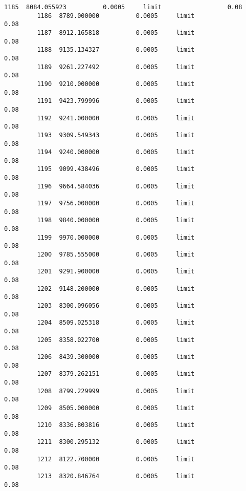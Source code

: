 \documentclass[11pt]{article}
\begin{document}
\begin{Verbatim}[commandchars=\\\{\}]
         1185  8084.055923          0.0005     limit                  0.08   
         1186  8789.000000          0.0005     limit                  0.08   
         1187  8912.165818          0.0005     limit                  0.08   
         1188  9135.134327          0.0005     limit                  0.08   
         1189  9261.227492          0.0005     limit                  0.08   
         1190  9210.000000          0.0005     limit                  0.08   
         1191  9423.799996          0.0005     limit                  0.08   
         1192  9241.000000          0.0005     limit                  0.08   
         1193  9309.549343          0.0005     limit                  0.08   
         1194  9240.000000          0.0005     limit                  0.08   
         1195  9099.438496          0.0005     limit                  0.08   
         1196  9664.584036          0.0005     limit                  0.08   
         1197  9756.000000          0.0005     limit                  0.08   
         1198  9840.000000          0.0005     limit                  0.08   
         1199  9970.000000          0.0005     limit                  0.08   
         1200  9785.555000          0.0005     limit                  0.08   
         1201  9291.900000          0.0005     limit                  0.08   
         1202  9148.200000          0.0005     limit                  0.08   
         1203  8300.096056          0.0005     limit                  0.08   
         1204  8509.025318          0.0005     limit                  0.08   
         1205  8358.022700          0.0005     limit                  0.08   
         1206  8439.300000          0.0005     limit                  0.08   
         1207  8379.262151          0.0005     limit                  0.08   
         1208  8799.229999          0.0005     limit                  0.08   
         1209  8505.000000          0.0005     limit                  0.08   
         1210  8336.803816          0.0005     limit                  0.08   
         1211  8300.295132          0.0005     limit                  0.08   
         1212  8122.700000          0.0005     limit                  0.08   
         1213  8320.846764          0.0005     limit                  0.08   
         

\end{Verbatim}
\end{document}
